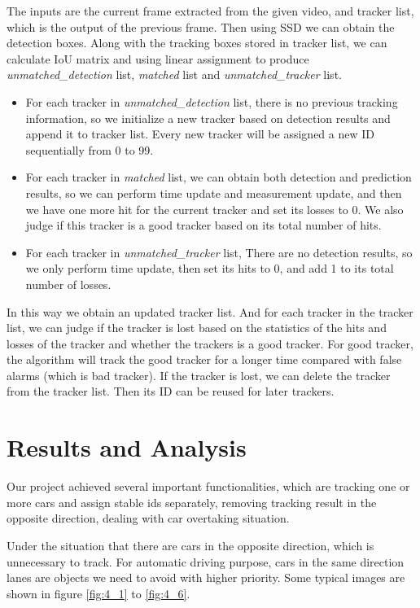 \documentclass[10pt,twocolumn,letterpaper]{article}
\begin{document}
The inputs are the current frame extracted from the given video, and tracker list, which is the output of the previous frame. Then using SSD we can obtain the detection boxes. Along with the tracking boxes stored in tracker list, we can calculate IoU matrix and using linear assignment to produce \emph{unmatched\_detection} list, \emph{matched} list and \emph{unmatched\_tracker} list. 

\begin{itemize}
\item For each tracker in \emph{unmatched\_detection} list, there is no previous tracking information, so we initialize a new tracker based on detection results and append it to tracker list. Every new tracker will be assigned a new ID sequentially from 0 to 99.
\item For each tracker in \emph{matched} list, we can obtain both detection and prediction results, so we can perform time update and measurement update, and then we have one more hit for the current tracker and set its losses to 0. We also judge if this tracker is a good tracker based on its total number of hits. 
\item For each tracker in \emph{unmatched\_tracker} list, There are no detection results, so we only perform time update, then set its hits to 0, and add 1 to its total number of losses. 
\end{itemize}

In this way we obtain an updated tracker list. And for each tracker in the tracker list, we can judge if the tracker is lost based on the statistics of the hits and losses of the tracker and whether the trackers is a good tracker. For good tracker, the algorithm will track the good tracker for a longer time compared with false alarms (which is bad tracker). If the tracker is lost, we can delete the tracker from the tracker list. Then its ID can be reused for later trackers.


\section{Results and Analysis}

Our project achieved several important functionalities, which are tracking one or more cars and assign stable ids separately, removing tracking result in the opposite direction, dealing with car overtaking situation. 

Under the situation that there are cars in the opposite direction, which is unnecessary to track. For automatic driving purpose, cars in the same direction lanes are objects we need to avoid with higher priority.   Some
typical images are shown in figure \ref{fig:4_1} to \ref{fig:4_6}.
\end{document}
